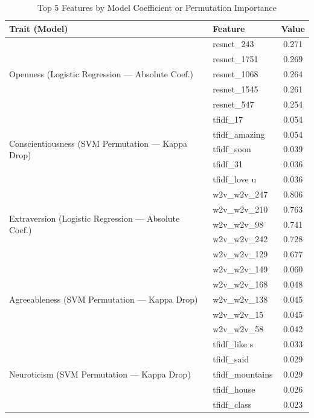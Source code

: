 \begin{table}[htbp]
	\centering
	\caption{Top 5 Features by Model Coefficient or Permutation Importance}
	\label{tab:importance}
	\begin{tabular}{@{} l l c @{}}
		\toprule
		\textbf{Trait (Model)} & \textbf{Feature} & \textbf{Value} \\
		\midrule
		\multirow{5}{3cm}{Openness (Logistic Regression --- Absolute Coef.)} 
		& resnet\_243  & 0.271 \\
		& resnet\_1751 & 0.269 \\
		& resnet\_1068 & 0.264 \\
		& resnet\_1545 & 0.261 \\
		& resnet\_547  & 0.254 \\
		\cmidrule(lr){1-3}
		\multirow{5}{3cm}{Conscientiousness (SVM Permutation --- Kappa Drop)} 
		& tfidf\_17       & 0.054 \\
		& tfidf\_amazing  & 0.054 \\
		& tfidf\_soon     & 0.039 \\
		& tfidf\_31       & 0.036 \\
		& tfidf\_love u   & 0.036 \\
		\cmidrule(lr){1-3}
		\multirow{5}{3cm}{Extraversion (Logistic Regression --- Absolute Coef.)} 
		& w2v\_w2v\_247 & 0.806 \\
		& w2v\_w2v\_210 & 0.763 \\
		& w2v\_w2v\_98  & 0.741 \\
		& w2v\_w2v\_242 & 0.728 \\
		& w2v\_w2v\_129 & 0.677 \\
		\cmidrule(lr){1-3}
		\multirow{5}{3cm}{Agreeableness (SVM Permutation --- Kappa Drop)} 
		& w2v\_w2v\_149 & 0.060 \\
		& w2v\_w2v\_168 & 0.048 \\
		& w2v\_w2v\_138 & 0.045 \\
		& w2v\_w2v\_15  & 0.045 \\
		& w2v\_w2v\_58  & 0.042 \\
		\cmidrule(lr){1-3}
		\multirow{5}{3cm}{Neuroticism (SVM Permutation --- Kappa Drop)} 
		& tfidf\_like s    & 0.033 \\
		& tfidf\_said      & 0.029 \\
		& tfidf\_mountains & 0.029 \\
		& tfidf\_house     & 0.026 \\
		& tfidf\_class     & 0.023 \\
		\bottomrule
	\end{tabular}
\end{table}

